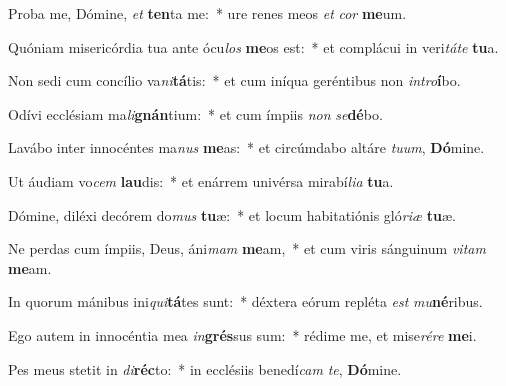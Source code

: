 \item Proba me, Dómine, \textit{et} \textbf{ten}ta me:~* ure renes meos \textit{et} \textit{cor} \textbf{me}um.
\item Quóniam misericórdia tua ante ócu\textit{los} \textbf{me}os est:~* et complácui in veri\textit{tá}\textit{te} \textbf{tu}a.
\item Non sedi cum concílio va\textit{ni}\textbf{tá}tis:~* et cum iníqua geréntibus non \textit{in}\textit{tro}\textbf{í}bo.
\item Odívi ecclésiam ma\textit{li}\textbf{gnán}tium:~* et cum ímpiis \textit{non} \textit{se}\textbf{dé}bo.
\item Lavábo inter innocéntes ma\textit{nus} \textbf{me}as:~* et circúmdabo altáre \textit{tu}\textit{um}, \textbf{Dó}mine.
\item Ut áudiam vo\textit{cem} \textbf{lau}dis:~* et enárrem univérsa mirabí\textit{li}\textit{a} \textbf{tu}a.
\item Dómine, diléxi decórem do\textit{mus} \textbf{tu}æ:~* et locum habitatiónis gló\textit{ri}\textit{æ} \textbf{tu}æ.
\item Ne perdas cum ímpiis, Deus, áni\textit{mam} \textbf{me}am,~* et cum viris sánguinum \textit{vi}\textit{tam} \textbf{me}am.
\item In quorum mánibus ini\textit{qui}\textbf{tá}tes sunt:~* déxtera eórum repléta \textit{est} \textit{mu}\textbf{né}ribus.
\item Ego autem in innocéntia mea \textit{in}\textbf{grés}sus sum:~* rédime me, et mise\textit{ré}\textit{re} \textbf{me}i.
\item Pes meus stetit in \textit{di}\textbf{réc}to:~* in ecclésiis benedí\textit{cam} \textit{te}, \textbf{Dó}mine.
